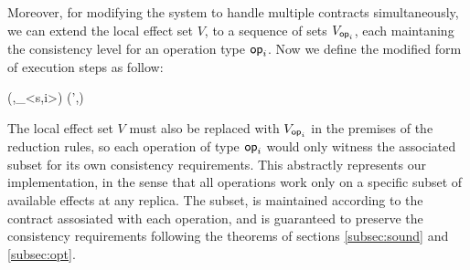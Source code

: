 Moreover, for modifying the system to handle multiple contracts
simultaneously, we can
extend the local effect set $V$, to a sequence
of sets $V_{{\normalfont \textsf{op}}_i}$, each maintaning  the consistency level for an
operation type ${\normalfont \textsf{op}}_i$. Now we define the modified form of execution steps as
follow:
\begin{smathpar}
(\E,\op_{<s,i>}) 
    \;\;
  (\E',\eff) 
\end{smathpar}
The local effect set $V$ must also be replaced with $V_{{\normalfont \textsf{op}}_i}$ in the 
premises of the reduction rules, so each operation of type ${\normalfont \textsf{op}}_i$ would
only witness the associated subset for its own consistency requirements.
This abstractly represents our implementation, in the sense that all operations
work only on a specific subset of available effects at any replica. The subset, is
maintained according to the contract assosiated with each operation, and
is guaranteed to preserve the consistency requirements following the
theorems of sections \ref{subsec:sound} and \ref{subsec:opt}. 

